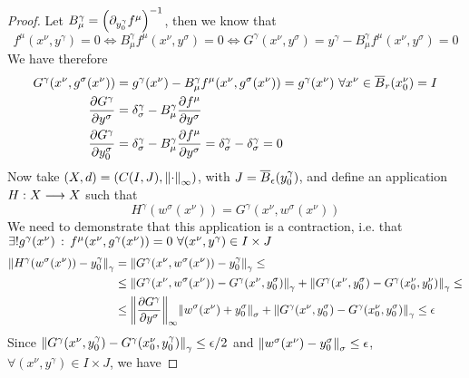 \documentclass[../complete.tex]{subfiles}
\begin{document}
\begin{proof}
	Let $B^\gamma_\mu=\left(\partial_{y_0^\gamma}f^\mu\right)^{-1}$, then we know that
	\begin{equation*}
		f^\mu(x^\nu,y^\gamma)=0\iff B^\gamma_\mu f^\mu(x^\nu,y^\sigma)=0\iff G^\gamma(x^\nu,y^\sigma)=y^\gamma-B^\gamma_\mu f^\mu(x^\nu,y^\sigma)=0
	\end{equation*}
	We have therefore
	\begin{equation*}
		\begin{aligned}
			G^\gamma(x^\nu,g^\sigma(x^\nu))&=g^\gamma(x^\nu)-B^\gamma_\mu f^\mu(x^\nu,g^\sigma(x^\nu))=g^\gamma(x^\nu)\ \forall x^\nu\in\overline{B}_r(x^\nu_0)=I\\
			\pdv{G^\gamma}{y^\sigma}&=\delta^\gamma_\sigma-B^\gamma_\mu\pdv{f^\mu}{y^\sigma}\\
			\pdv{G^\gamma}{y^\sigma_0}&=\delta^\gamma_\sigma-B^\gamma_\mu\pdv{f^\mu}{y^\sigma}=\delta^\gamma_\sigma-\delta^\gamma_\sigma=0\\
		\end{aligned}
	\end{equation*}
	Now take $(X,d)=(C(I,J),\norm{\cdot}_\infty)$, with $J=\overline{B}_\epsilon(y^\gamma_0)$, and define an application $H:X\overset{}{\longrightarrow} X$ such that
	\begin{equation*}
		H^\gamma(w^\sigma(x^\nu))=G^\gamma(x^\nu,w^\sigma(x^\nu))
	\end{equation*}
	We need to demonstrate that this application is a contraction, i.e. that $\exists!g^\gamma(x^\nu)\, :\,  f^\mu(x^\nu,g^\gamma(x^\nu))=0\ \forall(x^\nu,y^\gamma)\in I\times J$\\
	\begin{equation*} %
		\begin{aligned}
			\norm{H^\gamma(w^\sigma(x^\nu))-y^\gamma_0}_\gamma&=\norm{G^\gamma(x^\nu,w^\sigma(x^\nu))-y_0^\gamma}_\gamma\le\\
			&\le\norm{G^\gamma(x^\nu,w^\sigma(x^\nu))-G^\gamma(x^\nu,y^\sigma_0)}_\gamma+\norm{G^\gamma(x^\nu,y_0^\sigma)-G^\gamma(x_0^\nu,y_0^\nu)}_\gamma\le\\
			&\le\inorm{\pdv{G^\gamma}{y^\sigma}}\norm{w^\sigma(x^\nu)+y^\sigma_0}_\sigma+\norm{G^\gamma(x^\nu,y^\sigma_0)-G^\gamma(x^\nu_0,y^\sigma_0)}_\gamma\le\epsilon
		\end{aligned}
	\end{equation*} %
	Since $\norm{G^\gamma(x^\nu,y^\gamma_0)-G^\gamma(x^\nu_0,y^\gamma_0)}_\gamma\le\epsilon/2$ and $\norm{w^\sigma(x^\nu)-y^\sigma_0}_\sigma\le\epsilon$, $\forall(x^\nu,y^\gamma)\in I\times J$, we have %

\end{proof}
\end{document}
